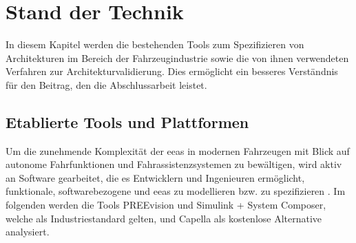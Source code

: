 
\chapter{Stand der Technik}
\label{ch:relatedWork}


In diesem Kapitel werden die bestehenden Tools zum Spezifizieren von Architekturen im Bereich der Fahrzeugindustrie sowie die von ihnen verwendeten Verfahren zur Architekturvalidierung. Dies ermöglicht ein besseres Verständnis für den Beitrag, den die Abschlussarbeit leistet.

\section{Etablierte Tools und Plattformen}
Um die zunehmende Komplexität der \glspl{eea} in modernen Fahrzeugen mit Blick auf autonome Fahrfunktionen und Fahrassistenzsystemen zu bewältigen, wird aktiv an Software gearbeitet, die es Entwicklern und Ingenieuren ermöglicht, funktionale, softwarebezogene und \glspl{eea} zu modellieren bzw. zu spezifizieren \cite{askaripoor2022architecture} \cite{schauffele2016architectural}. Im folgenden werden die Tools PREEvision und Simulink + System Composer, welche als Industriestandard gelten, und Capella als kostenlose Alternative analysiert.


